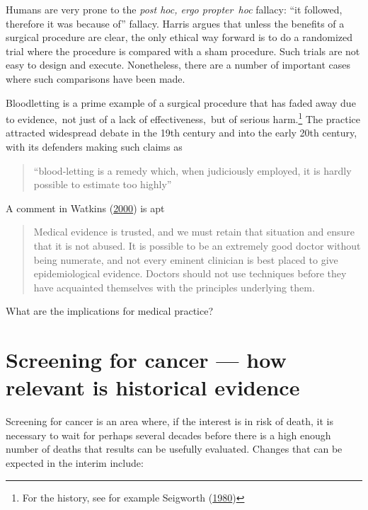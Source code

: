 \documentclass[
  10ptls,
  b5paper]{book}
\begin{document}
Humans are very prone to the \emph{post hoc, ergo propter~hoc} fallacy: ``it
followed, therefore it was because of'' fallacy. Harris argues that
unless the benefits of a surgical procedure are clear, the only ethical
way forward is to do a randomized trial where the procedure is compared
with a sham procedure. Such trials are not easy to design and execute.
Nonetheless, there are a number of important cases where such
comparisons have been made.

Bloodletting is a prime example of a surgical procedure that has faded
away due to evidence,~not just of a lack of effectiveness,~but of
serious harm.\footnote{For the history, see for example
  Seigworth (\protect\hyperlink{ref-seigworth1980bloodletting}{1980})} The practice attracted widespread debate
in the 19th century and into the early 20th century, with its defenders
making such claims as

\begin{quote}
``blood-letting is a remedy which, when judiciously employed, it is
hardly possible to estimate too highly''
\end{quote}

A comment in Watkins (\protect\hyperlink{ref-watkins2000conviction}{2000}) is apt

\begin{quote}
Medical evidence is trusted, and we must retain that situation and
ensure that it is not abused. It is possible to be an extremely good
doctor without being numerate, and not every eminent clinician is best
placed to give epidemiological evidence. Doctors should not use
techniques before they have acquainted themselves with the principles
underlying them.
\end{quote}

What are the implications for medical practice?

\hypertarget{screening-for-cancer-how-relevant-is-historical-evidence}{%
\section{Screening for cancer --- how relevant is historical evidence}\label{screening-for-cancer-how-relevant-is-historical-evidence}}

Screening for cancer is an area where, if the interest is in
risk of death, it is necessary to wait for perhaps several
decades before there is a high enough number of deaths that
results can be usefully evaluated. Changes that can be
expected in the interim include:
\end{document}
